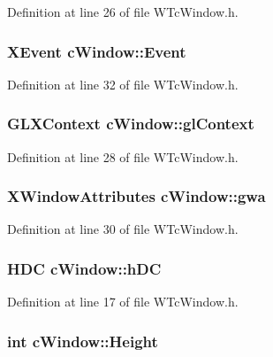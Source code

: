 Definition at line 26 of file WTcWindow.h.

\hypertarget{classc_window_a7c80cc6152a4d9721a58d2e08cb756b9}{
\subsubsection[{Event}]{\setlength{\rightskip}{0pt plus 5cm}XEvent {\bf cWindow::Event}}}
\label{classc_window_a7c80cc6152a4d9721a58d2e08cb756b9}


Definition at line 32 of file WTcWindow.h.

\hypertarget{classc_window_a02f6fffcec5cc04c13eb2f21d7587afd}{
\subsubsection[{glContext}]{\setlength{\rightskip}{0pt plus 5cm}GLXContext {\bf cWindow::glContext}}}
\label{classc_window_a02f6fffcec5cc04c13eb2f21d7587afd}


Definition at line 28 of file WTcWindow.h.

\hypertarget{classc_window_a725ac4f4be7f80ef0a4bc7e2b087d025}{
\subsubsection[{gwa}]{\setlength{\rightskip}{0pt plus 5cm}XWindowAttributes {\bf cWindow::gwa}}}
\label{classc_window_a725ac4f4be7f80ef0a4bc7e2b087d025}


Definition at line 30 of file WTcWindow.h.

\hypertarget{classc_window_a0be2237675821132fbd3f04711680aa6}{
\subsubsection[{hDC}]{\setlength{\rightskip}{0pt plus 5cm}HDC {\bf cWindow::hDC}}}
\label{classc_window_a0be2237675821132fbd3f04711680aa6}


Definition at line 17 of file WTcWindow.h.

\hypertarget{classc_window_a6e20b3f2dec19a97a0a7e536c9920b26}{
\subsubsection[{Height}]{\setlength{\rightskip}{0pt plus 5cm}int {\bf cWindow::Height}}}
\label{classc_window_a6e20b3f2dec19a97a0a7e536c9920b26}


